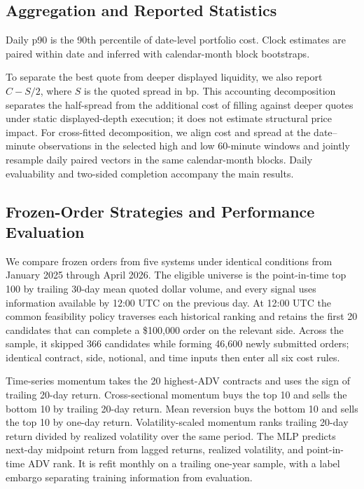 \documentclass[sigconf]{acmart}
\begin{document}
\subsection{Aggregation and Reported Statistics}
Daily p90 is the 90th percentile of date-level portfolio cost. Clock estimates are paired within date and inferred with calendar-month block bootstraps.

To separate the best quote from deeper displayed liquidity, we also report $C-S/2$, where $S$ is the quoted spread in bp. This accounting decomposition separates the half-spread from the additional cost of filling against deeper quotes under static displayed-depth execution; it does not estimate structural price impact. For cross-fitted decomposition, we align cost and spread at the date--minute observations in the selected high and low 60-minute windows and jointly resample daily paired vectors in the same calendar-month blocks. Daily evaluability and two-sided completion accompany the main results.

\subsection{Frozen-Order Strategies and Performance Evaluation}
We compare frozen orders from five systems under identical conditions from January 2025 through April 2026. The eligible universe is the point-in-time top 100 by trailing 30-day mean quoted dollar volume, and every signal uses information available by 12:00 UTC on the previous day. At 12:00 UTC the common feasibility policy traverses each historical ranking and retains the first 20 candidates that can complete a \$100,000 order on the relevant side. Across the sample, it skipped 366 candidates while forming 46,600 newly submitted orders; identical contract, side, notional, and time inputs then enter all six cost rules.

Time-series momentum takes the 20 highest-ADV contracts and uses the sign of trailing 20-day return. Cross-sectional momentum buys the top 10 and sells the bottom 10 by trailing 20-day return. Mean reversion buys the bottom 10 and sells the top 10 by one-day return. Volatility-scaled momentum ranks trailing 20-day return divided by realized volatility over the same period. The MLP predicts next-day midpoint return from lagged returns, realized volatility, and point-in-time ADV rank. It is refit monthly on a trailing one-year sample, with a label embargo separating training information from evaluation.
\end{document}
